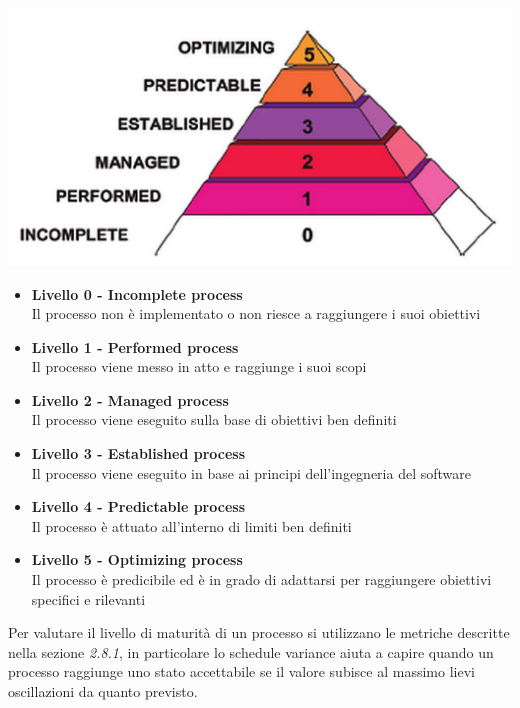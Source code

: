 {  \begin{center}
    \includegraphics[scale=1.3]{img/Iso15504.jpg}
  \end{center}



  \begin{itemize}
  \item \textbf{Livello 0 - Incomplete process}\\
    Il processo non è implementato o non riesce a raggiungere i suoi obiettivi
  \item \textbf{Livello 1 - Performed process}\\
    Il processo viene messo in atto e raggiunge i suoi scopi
  \item  \textbf{Livello 2 - Managed process}\\
    Il processo viene eseguito sulla base di obiettivi ben definiti
  \item  \textbf{Livello 3 - Established process}\\
    Il processo viene eseguito in base ai principi dell'ingegneria del software
  \item  \textbf{Livello 4 - Predictable process}\\
    Il processo è attuato all'interno di limiti ben definiti
  \item  \textbf{Livello 5 - Optimizing process}\\
    Il processo è predicibile ed è in grado di adattarsi per raggiungere obiettivi specifici e rilevanti
  \end{itemize}

  Per valutare il livello di maturità di un processo si utilizzano le
  metriche descritte nella sezione \emph{2.8.1}, in particolare lo
  schedule variance aiuta a capire quando un processo raggiunge uno
  stato accettabile se il valore subisce al massimo lievi oscillazioni
  da quanto previsto.





}

